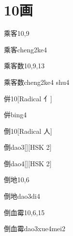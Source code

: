 
\section*{10画}

\begin{entry}{乘客}{10,9}
  \begin{phonetics}{乘客}{cheng2ke4}
  \end{phonetics}
\end{entry}

\begin{entry}{乘客数}{10,9,13}
  \begin{phonetics}{乘客数}{cheng2ke4 shu4}
  \end{phonetics}
\end{entry}

\begin{entry}{倂}{10}[Radical 亻]
  \begin{phonetics}{倂}{bing4}
  \end{phonetics}
\end{entry}

\begin{entry}{倒}{10}[Radical 人]
  \begin{phonetics}{倒}{dao3}[][HSK 2]
  \end{phonetics}
  \begin{phonetics}{倒}{dao4}[][HSK 2]
  \end{phonetics}
\end{entry}

\begin{entry}{倒地}{10,6}
  \begin{phonetics}{倒地}{dao3di4}
  \end{phonetics}
\end{entry}

\begin{entry}{倒血霉}{10,6,15}
  \begin{phonetics}{倒血霉}{dao3xue4mei2}
  \end{phonetics}
\end{entry}

